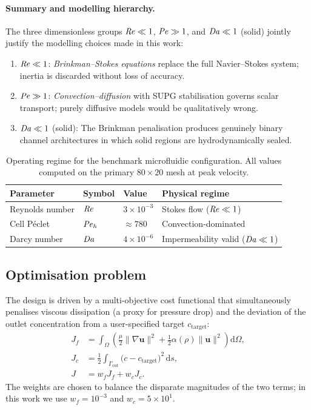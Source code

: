 \paragraph{Summary and modelling hierarchy.}
The three dimensionless groups $\mathit{Re}\ll1$, $\mathit{Pe}\gg1$, and $\mathit{Da}\ll1$
(solid) jointly justify the modelling choices made in this work:
%
\begin{enumerate}
  \item $\mathit{Re}\ll1$: \emph{Brinkman--Stokes equations} replace the full
        Navier--Stokes system; inertia is discarded without loss of accuracy.
  \item $\mathit{Pe}\gg1$: \emph{Convection--diffusion} with SUPG stabilisation
        governs scalar transport; purely diffusive models would be
        qualitatively wrong.
  \item $\mathit{Da}\ll1$ (solid): The Brinkman penalisation produces genuinely
        binary channel architectures in which solid regions are
        hydrodynamically sealed.
\end{enumerate}

\begin{table}[h]
\centering\small
\caption{Operating regime for the benchmark microfluidic configuration.
         All values computed on the primary $80\times20$ mesh at peak velocity.}
\label{tab:regime}
\begin{tabular}{@{}llll@{}}
\toprule
Parameter & Symbol & Value & Physical regime \\
\midrule
Reynolds number & $\mathit{Re}$ & $3\times10^{-3}$ & Stokes flow ($\mathit{Re}\ll1$) \\
Cell P\'{e}clet & $\mathit{Pe}_h$ & $\approx780$ & Convection-dominated \\
Darcy number & $\mathit{Da}$ & $4\times10^{-6}$ & Impermeability valid ($\mathit{Da}\ll1$) \\
\bottomrule
\end{tabular}
\end{table}

\subsection{Optimisation problem}
The design is driven by a multi-objective cost functional that simultaneously penalises viscous dissipation (a proxy for pressure drop) and the deviation of the outlet concentration from a user-specified target \(c_{\text{target}}\):
\begin{subequations}
\label{eq:objective}
\begin{align}
    J_f &= \int_{\Omega} \left( \frac{\mu}{2}\|\nabla\mathbf{u}\|^2 + \frac12 \alpha(\rho)\|\mathbf{u}\|^2 \right) \mathrm{d}\Omega, \label{eq:Jf} \\
    J_c &= \frac12 \int_{\Gamma_{\text{out}}} \bigl(c - c_{\text{target}}\bigr)^2 \,\mathrm{d}s, \label{eq:Jc} \\
    J   &= w_f J_f + w_c J_c. \label{eq:J}
\end{align}
\end{subequations}
The weights are chosen to balance the disparate magnitudes of the two terms; in this work we use \(w_f = 10^{-3}\) and \(w_c = 5\times 10^{1}\).

